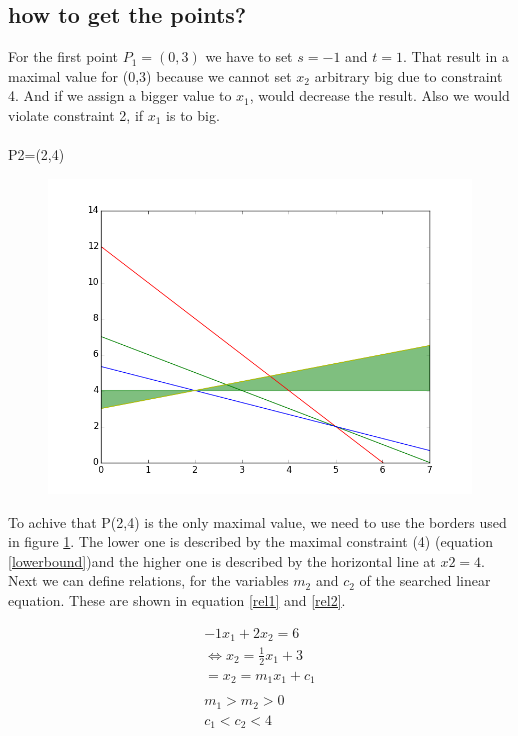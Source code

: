 \documentclass[%
   10pt,              %
   nenglish,           %
   a4paper,           %
   DIV11,             %
]{scrartcl}%
\begin{document}
\subsection*{how to get the points?}

For the first point $P_1=(0,3)$ we have to set $s = -1$ and $t = 1$. That result in a maximal value 
for (0,3) because we cannot set $x_2$ arbitrary big due to constraint 4. And if we assign a bigger 
value to $x_1$, would decrease the result. Also we would violate constraint 2, if $x_1$ is to big.\\
\\
P2=(2,4)\\


\begin{figure}[h]
	\includegraphics[width=\textwidth]{img/figure-P24.png}
	\label{P24}
\end{figure}

To achive that P(2,4) is the only maximal value, we need to use the borders used in figure \ref{P24}. The lower one is described by the maximal constraint (4) (equation \ref{lowerbound})and the higher one is described by the horizontal line at $x2=4$. Next we can define relations, for the variables $m_2$ and $c_2$ of the searched linear equation. These are shown in equation \ref{rel1} and \ref{rel2}.

\begin{eqnarray}
-1x_1+2x_2=6\\
\Leftrightarrow  x_2 = \frac{1}{2} x_1 +3 \label{lowerbound}\\
=	x_2= m_1 x_1 + c_1\\
	\\
	m_1 > m_2 > 0 \label{rel1}\\
	c_1<c_2<4 \label{rel2}\\
\end{eqnarray}
\end{document}
